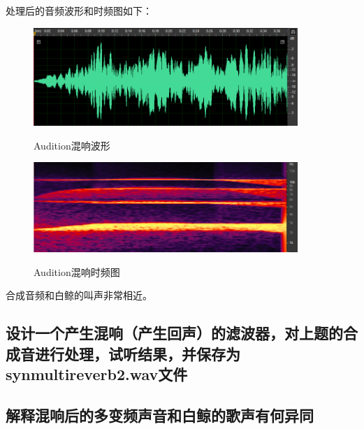 \documentclass{article}
\begin{document}
            处理后的音频波形和时频图如下：
            \begin{figure}[htb]
                \centering
                \includegraphics[width=10cm]{figure15.png}
                \label{fig:reverb1-3}\caption{Audition混响波形}
            \end{figure}
            \begin{figure}[htb]
                \centering
                \includegraphics[width=10cm]{figure16.png}
                \label{fig:reverb1-4}\caption{Audition混响时频图}
            \end{figure}
            
            合成音频和白鲸的叫声非常相近。
            
        \subsection{设计一个产生混响（产生回声）的滤波器，对上题的合成音进行处理，试听结果，并保存为synmultireverb2.wav文件}
            
            
        \subsection{解释混响后的多变频声音和白鲸的歌声有何异同}
\end{document}

